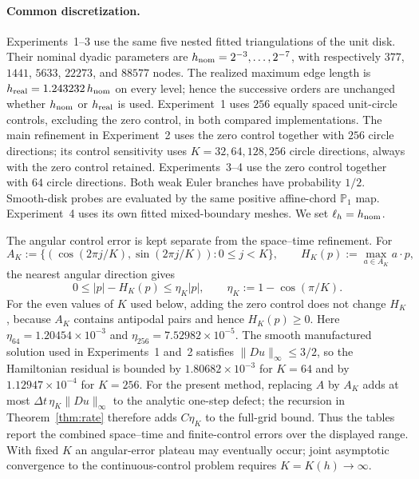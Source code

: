 \documentclass[11pt]{article}
\theoremstyle{definition}
\theoremstyle{remark}
\begin{document}
\paragraph{Common discretization.}
Experiments~1--3 use the same five nested fitted triangulations of the unit
disk.  Their nominal dyadic parameters are
$h_{\rm nom}=2^{-3},\ldots,2^{-7}$, with respectively
$377$, $1441$, $5633$, $22273$, and $88577$ nodes.  The realized maximum edge
length is $h_{\rm real}=1.243232\,h_{\rm nom}$ on every level; hence the
successive orders are unchanged whether $h_{\rm nom}$ or $h_{\rm real}$ is
used.  Experiment~1 uses $256$ equally spaced unit-circle controls, excluding
the zero control, in both compared implementations.  The main refinement in
Experiment~2 uses the zero control together with $256$ circle directions; its
control sensitivity uses $K=32,64,128,256$ circle directions, always with the
zero control retained.  Experiments~3--4 use the zero control together with
$64$ circle directions.  Both weak Euler branches have probability $1/2$.
Smooth-disk probes are evaluated by the same positive affine-chord
$\mathbb P_1$ map.  Experiment~4 uses its own fitted mixed-boundary meshes.
We set $\ell_h=h_{\rm nom}$.

The angular control error is kept separate from the space--time refinement.
For
\[
 A_K:=\{(\cos(2\pi j/K),\sin(2\pi j/K)):0\le j<K\},
 \qquad H_K(p):=\max_{a\in A_K}a\cdot p,
\]
the nearest angular direction gives
\begin{equation}
 0\le |p|-H_K(p)
 \le \eta_K|p|,
 \qquad \eta_K:=1-\cos(\pi/K).
 \label{eq:angular-control-error}
\end{equation}
For the even values of $K$ used below, adding the zero control does not change
$H_K$, because $A_K$ contains antipodal pairs and hence $H_K(p)\ge0$.
Here $\eta_{64}=1.20454\times10^{-3}$ and
$\eta_{256}=7.52982\times10^{-5}$.  The smooth manufactured solution used in
Experiments~1 and~2 satisfies $\|Du\|_\infty\le3/2$, so the Hamiltonian
residual is bounded by
$1.80682\times10^{-3}$ for $K=64$ and by
$1.12947\times10^{-4}$ for $K=256$.
For the present method, replacing $A$ by $A_K$ adds at most
$\Delta t\,\eta_K\|Du\|_\infty$ to the analytic one-step defect; the recursion
in Theorem~\ref{thm:rate} therefore adds $C\eta_K$ to the full-grid bound.
Thus the tables report the combined space--time and finite-control errors over
the displayed range.  With fixed $K$ an angular-error plateau may eventually
occur; joint asymptotic convergence to the continuous-control problem
requires $K=K(h)\to\infty$.
\end{document}
